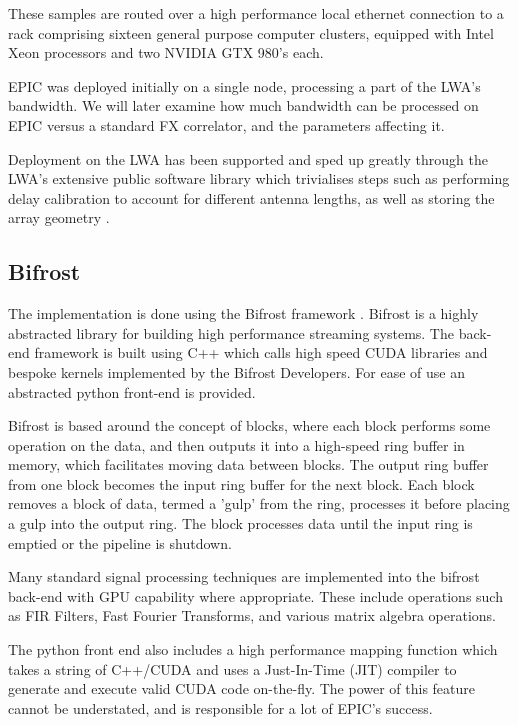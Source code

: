 \documentclass[bibliography=totocnumbered, twocolumn]{article}
\begin{document}
These samples are routed over a high performance local ethernet
connection to a rack comprising sixteen general purpose computer
clusters, equipped with Intel Xeon processors and two NVIDIA GTX 980's
each.

EPIC was deployed initially on a single node, processing a part of
the LWA's bandwidth. We will later examine how much bandwidth can
be processed on EPIC versus a standard FX correlator, and the parameters
affecting it.

Deployment on the LWA has been supported and sped up greatly through
the LWA's extensive public software library which trivialises steps such as
performing delay calibration to account for different antenna lengths,
as well as storing the array geometry \cite{dowell_long_2012}.

\subsection{Bifrost}

The implementation is done using the Bifrost framework
\cite{cranmer_bifrost:_2017}. Bifrost is a highly abstracted library
for building high performance streaming systems. The back-end
framework is built using C++ which calls high speed CUDA libraries
and bespoke kernels implemented by the Bifrost Developers. For
ease of use an abstracted python front-end is provided.

Bifrost is based around the concept of blocks, where each block performs
some operation on the data, and then outputs it into a high-speed
ring buffer in memory, which facilitates moving data between blocks.
The output ring buffer from one block becomes the input ring buffer
for the next block. Each block removes a block of data, termed a
'gulp' from the ring, processes it before placing a gulp into
the output ring. The block processes data until the input ring is emptied
or the pipeline is shutdown.

Many standard signal processing techniques are implemented into
the bifrost back-end with GPU capability where appropriate. These
include operations such as FIR Filters, Fast Fourier Transforms,
and various matrix algebra operations.

The python front end also includes a high performance mapping
function which takes a string of C++/CUDA and uses a Just-In-Time (JIT)
compiler to generate and execute valid CUDA code on-the-fly. The
power of this feature cannot be understated, and is responsible
for a lot of EPIC's success.
\end{document}
